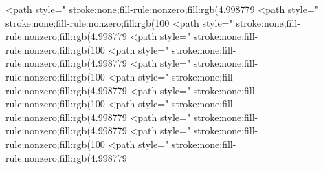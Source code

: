 <path style=" stroke:none;fill-rule:nonzero;fill:rgb(4.998779%
<path style=" stroke:none;fill-rule:nonzero;fill:rgb(100%
<path style=" stroke:none;fill-rule:nonzero;fill:rgb(4.998779%
<path style=" stroke:none;fill-rule:nonzero;fill:rgb(100%
<path style=" stroke:none;fill-rule:nonzero;fill:rgb(4.998779%
<path style=" stroke:none;fill-rule:nonzero;fill:rgb(100%
<path style=" stroke:none;fill-rule:nonzero;fill:rgb(4.998779%
<path style=" stroke:none;fill-rule:nonzero;fill:rgb(100%
<path style=" stroke:none;fill-rule:nonzero;fill:rgb(4.998779%
<path style=" stroke:none;fill-rule:nonzero;fill:rgb(4.998779%
<path style=" stroke:none;fill-rule:nonzero;fill:rgb(100%
<path style=" stroke:none;fill-rule:nonzero;fill:rgb(4.998779%

